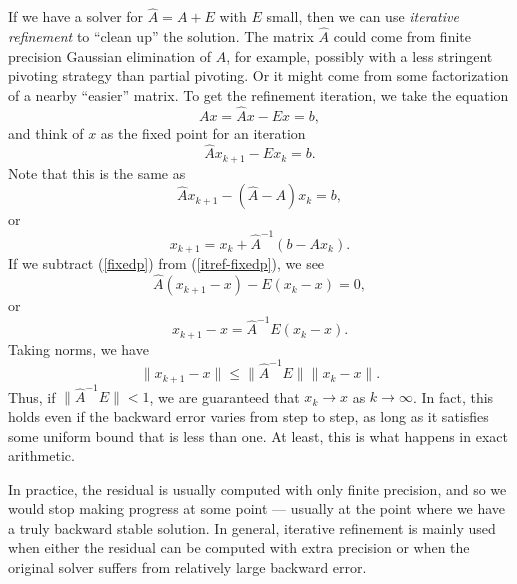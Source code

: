 \documentclass[12pt, leqno]{article} %
\begin{document}
If we have a solver for $\hat{A} = A + E$ with $E$ small, then we can
use {\em iterative refinement} to ``clean up'' the solution.  The
matrix $\hat{A}$ could come from finite precision Gaussian elimination
of $A$, for example, possibly with a less stringent pivoting strategy
than partial pivoting.  Or it might come from some factorization of a
nearby ``easier'' matrix.  To get the refinement iteration, we take
the equation
\begin{equation} \label{fixedp}
  Ax = \hat{A}x-Ex = b,
\end{equation}
and think of $x$ as the fixed point for an iteration
\begin{equation} \label{itref-fixedp}
  \hat{A} x_{k+1} - E x_k = b.
\end{equation}
Note that this is the same as
\[
  \hat{A} x_{k+1} - (\hat{A} - A) x_k = b,
\]
or
\[
  x_{k+1} = x_k + \hat{A}^{-1} (b - A x_{k}).
\]
If we subtract (\ref{fixedp}) from (\ref{itref-fixedp}), we see
\[
  \hat{A}(x_{k+1}-x) - E(x_k-x) = 0,
\]
or
\[
  x_{k+1}-x = \hat{A}^{-1} E (x_k-x).
\]
Taking norms, we have
\[
  \|x_{k+1}-x\| \leq \|\hat{A}^{-1} E\| \|x_k-x\|.
\]
Thus, if $\|\hat{A}^{-1} E\| < 1$, we are guaranteed that $x_{k} \rightarrow x$
as $k \rightarrow \infty$.  In fact, this holds even if the backward error
varies from step to step, as long as it satisfies some uniform bound that is
less than one.  At least, this is what happens in exact arithmetic.

In practice, the residual is usually computed with only finite precision,
and so we would stop making progress at some point --- usually at
the point where we have a truly backward stable solution.  In general,
iterative refinement is mainly used when either the residual can be
computed with extra precision or when the original solver suffers from
relatively large backward error.
\end{document}
